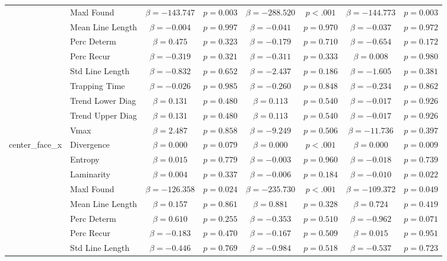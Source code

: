 \begin{tabular}{llcc|cc|cc}
 & Maxl Found & $\beta = -143.747$ & $p = 0.003$ & $\beta = -288.520$ & $p < .001$ & $\beta = -144.773$ & $p = 0.003$ \\
 & Mean Line Length & $\beta = -0.004$ & $p = 0.997$ & $\beta = -0.041$ & $p = 0.970$ & $\beta = -0.037$ & $p = 0.972$ \\
 & Perc Determ & $\beta = 0.475$ & $p = 0.323$ & $\beta = -0.179$ & $p = 0.710$ & $\beta = -0.654$ & $p = 0.172$ \\
 & Perc Recur & $\beta = -0.319$ & $p = 0.321$ & $\beta = -0.311$ & $p = 0.333$ & $\beta = 0.008$ & $p = 0.980$ \\
 & Std Line Length & $\beta = -0.832$ & $p = 0.652$ & $\beta = -2.437$ & $p = 0.186$ & $\beta = -1.605$ & $p = 0.381$ \\
 & Trapping Time & $\beta = -0.026$ & $p = 0.985$ & $\beta = -0.260$ & $p = 0.848$ & $\beta = -0.234$ & $p = 0.862$ \\
 & Trend Lower Diag & $\beta = 0.131$ & $p = 0.480$ & $\beta = 0.113$ & $p = 0.540$ & $\beta = -0.017$ & $p = 0.926$ \\
 & Trend Upper Diag & $\beta = 0.131$ & $p = 0.480$ & $\beta = 0.113$ & $p = 0.540$ & $\beta = -0.017$ & $p = 0.926$ \\
 & Vmax & $\beta = 2.487$ & $p = 0.858$ & $\beta = -9.249$ & $p = 0.506$ & $\beta = -11.736$ & $p = 0.397$ \\
\midrule
\multirow{12}{*}{center_face_x} & Divergence & $\beta = 0.000$ & $p = 0.079$ & $\beta = 0.000$ & $p < .001$ & $\beta = 0.000$ & $p = 0.009$ \\
 & Entropy & $\beta = 0.015$ & $p = 0.779$ & $\beta = -0.003$ & $p = 0.960$ & $\beta = -0.018$ & $p = 0.739$ \\
 & Laminarity & $\beta = 0.004$ & $p = 0.337$ & $\beta = -0.006$ & $p = 0.184$ & $\beta = -0.010$ & $p = 0.022$ \\
 & Maxl Found & $\beta = -126.358$ & $p = 0.024$ & $\beta = -235.730$ & $p < .001$ & $\beta = -109.372$ & $p = 0.049$ \\
 & Mean Line Length & $\beta = 0.157$ & $p = 0.861$ & $\beta = 0.881$ & $p = 0.328$ & $\beta = 0.724$ & $p = 0.419$ \\
 & Perc Determ & $\beta = 0.610$ & $p = 0.255$ & $\beta = -0.353$ & $p = 0.510$ & $\beta = -0.962$ & $p = 0.071$ \\
 & Perc Recur & $\beta = -0.183$ & $p = 0.470$ & $\beta = -0.167$ & $p = 0.509$ & $\beta = 0.015$ & $p = 0.951$ \\
 & Std Line Length & $\beta = -0.446$ & $p = 0.769$ & $\beta = -0.984$ & $p = 0.518$ & $\beta = -0.537$ & $p = 0.723$ \\

\end{tabular}
